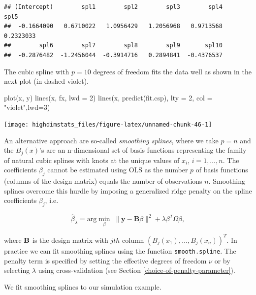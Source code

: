 \documentclass[
]{book}
\newenvironment{Shaded}{\begin{snugshade}}{\end{snugshade}}
\newcommand{\AttributeTok}[1]{\textcolor[rgb]{0.77,0.63,0.00}{#1}}
\newcommand{\DecValTok}[1]{\textcolor[rgb]{0.00,0.00,0.81}{#1}}
\newcommand{\FunctionTok}[1]{\textcolor[rgb]{0.00,0.00,0.00}{#1}}
\newcommand{\NormalTok}[1]{#1}
\newcommand{\StringTok}[1]{\textcolor[rgb]{0.31,0.60,0.02}{#1}}
\begin{document}
\begin{verbatim}
## (Intercept)        spl1        spl2        spl3        spl4        spl5 
##  -0.1664090   0.6710022   1.0956429   1.2056968   0.9713568   0.2323033 
##        spl6        spl7        spl8        spl9       spl10 
##  -0.2876482  -1.2456044  -0.3914716   0.2894841  -0.4376537
\end{verbatim}

The cubic spline with \(p=10\) degrees of freedom fits the data well as shown in the next plot (in dashed violet).

\begin{Shaded}
\begin{Highlighting}[]
\FunctionTok{plot}\NormalTok{(x, y)}
\FunctionTok{lines}\NormalTok{(x, fx, }\AttributeTok{lwd =} \DecValTok{2}\NormalTok{)}
\FunctionTok{lines}\NormalTok{(x, }\FunctionTok{predict}\NormalTok{(fit.csp), }\AttributeTok{lty =} \DecValTok{2}\NormalTok{, }\AttributeTok{col =} \StringTok{"violet"}\NormalTok{,}\AttributeTok{lwd=}\DecValTok{3}\NormalTok{)}
\end{Highlighting}
\end{Shaded}

\begin{center}\texttt{[image: highdimstats\_files/figure-latex/unnamed-chunk-46-1]} \end{center}

An alternative approach are so-called \emph{smoothing splines}, where we take \(p=n\) and the \(B_j(x)\)'s are an n-dimensional set of basis functions representing the family of natural cubic splines with knots at the unique values of \(x_i\), \(i=1,\ldots,n\). The coefficients \(\beta_j\) cannot be estimated using OLS as the number \(p\) of basis functions (columns of the design matrix) equals the number of observations \(n\). Smoothing splines overcome this hurdle by imposing a generalized ridge penalty on the spline coefficients \(\beta_j\), i.e.

\[\hat{\beta}_{\lambda}=\textrm{arg}\min\limits_{\beta}\;\|\textbf{y}- \textbf{B} \beta\|^2+\lambda \beta^T\Omega\beta,\]

where \(\bf B\) is the design matrix with \(jth\) column \((B_j(x_1),\ldots,B_j(x_n))^T\). In practice we can fit
smoothing splines using the function \texttt{smooth.spline}. The penalty term is specified by setting the effective degrees of freedom \(\nu\) or by selecting \(\lambda\) using cross-validation (see Section \ref{choice-of-penalty-parameter}).

We fit smoothing splines to our simulation example.
\end{document}
